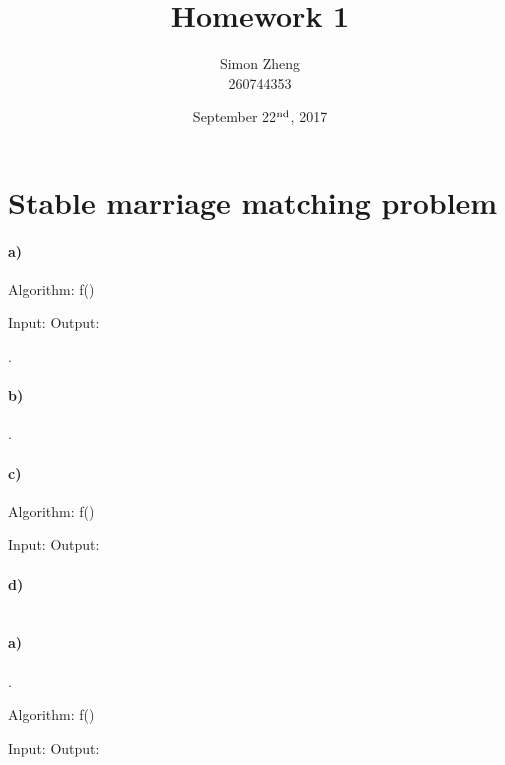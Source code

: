 \documentclass[11pt,letterpaper]{article}
\author{Simon Zheng\\260744353}
\title{Homework 1}
\date{September 22$^{\textnormal{nd}}$, 2017}
\begin{document}
	\maketitle
	\thispagestyle{fancy}
	
	\section{Stable marriage matching problem}
	
		\paragraph{a)}
		\begin{center}
		Algorithm: f()
		\end{center}
        \begin{algorithm}[caption={}, label={alg1}]
Input: 
Output: 


        \end{algorithm}
    
    .
		
		\paragraph{b)}
		.
		
		\paragraph{c)}
		\begin{center}
		Algorithm: f()
		\end{center}
		\begin{algorithm}[caption={}, label={alg2}]
Input: 
Output: 


		\end{algorithm}
		
		\paragraph{d)}
		
		
	\section{}
	
		\paragraph{a)}
		.
		\begin{center}
		Algorithm: f()
		\end{center}
		\begin{algorithm}[caption={}, label={alg3}]
Input: 
Output: 


		\end{algorithm}
		
\end{document}
